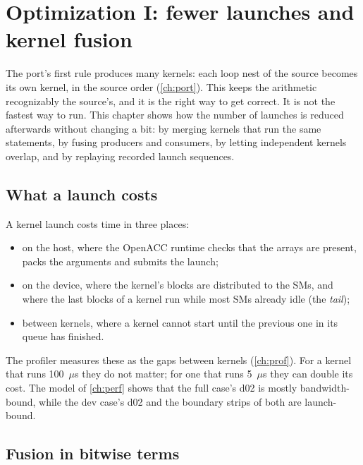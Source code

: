 \chapter{Optimization I: fewer launches and kernel fusion}\label{ch:fusion}

The port's first rule produces many kernels: each loop nest of the source becomes its own kernel, in the source order
(\cref{ch:port}). This keeps the arithmetic recognizably the source's, and it is the right way to get correct. It is
not the fastest way to run. This chapter shows how the number of launches is reduced afterwards without changing a
bit: by merging kernels that run the same statements, by fusing producers and consumers, by letting independent
kernels overlap, and by replaying recorded launch sequences.

\section{What a launch costs}

A kernel launch costs time in three places:
\begin{itemize}
  \item on the host, where the OpenACC runtime checks that the arrays are present, packs the arguments and submits
    the launch;
  \item on the device, where the kernel's blocks are distributed to the SMs, and where the last blocks of a kernel run
    while most SMs already idle (the \emph{tail});
  \item between kernels, where a kernel cannot start until the previous one in its queue has finished.
\end{itemize}
The profiler measures these as the gaps between kernels (\cref{ch:prof}). For a kernel that runs 100~$\mu$s they do
not matter; for one that runs 5~$\mu$s they can double its cost. The model of \cref{ch:perf} shows that the full
case's d02 is mostly bandwidth-bound, while the dev case's d02 and the boundary strips of both are launch-bound.

\section{Fusion in bitwise terms}

